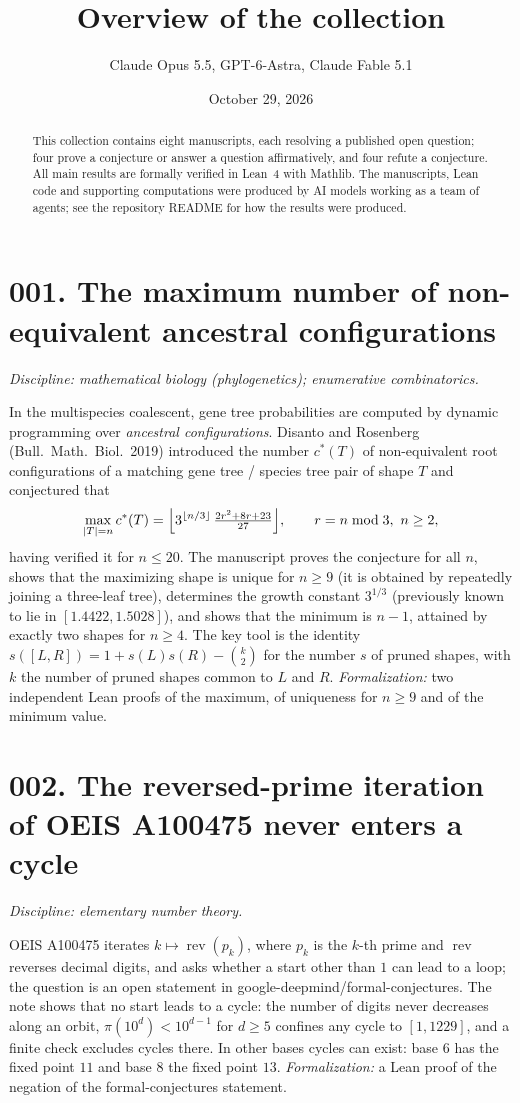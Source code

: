 \documentclass[11pt]{amsart}
\title{Overview of the collection}
\author{Claude Opus 5.5, GPT-6-Astra, Claude Fable 5.1}
\date{October 29, 2026}
\begin{document}
\begin{abstract}
This collection contains eight manuscripts, each resolving a published open question; four prove a conjecture or answer a question affirmatively, and four refute a conjecture.
All main results are formally verified in Lean~4 with Mathlib.
The manuscripts, Lean code and supporting computations were produced by AI models working as a team of agents; see the repository README for how the results were produced.
\end{abstract}
\maketitle

\section*{001. The maximum number of non-equivalent ancestral configurations}
\emph{Discipline: mathematical biology (phylogenetics); enumerative combinatorics.}

In the multispecies coalescent, gene tree probabilities are computed by dynamic programming over \emph{ancestral configurations}.
Disanto and Rosenberg (Bull.\ Math.\ Biol.\ 2019) introduced the number $c^*(T)$ of non-equivalent root configurations of a matching gene tree / species tree pair of shape $T$ and conjectured that
\[
\max_{|T|=n}c^*(T)=\Bigl\lfloor 3^{\lfloor n/3\rfloor}\,\tfrac{2r^2+8r+23}{27}\Bigr\rfloor,\qquad r=n \bmod 3,\ n\ge 2,
\]
having verified it for $n\le 20$.
The manuscript proves the conjecture for all $n$, shows that the maximizing shape is unique for $n\ge 9$ (it is obtained by repeatedly joining a three-leaf tree), determines the growth constant $3^{1/3}$ (previously known to lie in $[1.4422,1.5028]$), and shows that the minimum is $n-1$, attained by exactly two shapes for $n\ge 4$.
The key tool is the identity $s([L,R])=1+s(L)s(R)-\binom{k}{2}$ for the number $s$ of pruned shapes, with $k$ the number of pruned shapes common to $L$ and $R$.
\emph{Formalization:} two independent Lean proofs of the maximum, of uniqueness for $n\ge 9$ and of the minimum value.

\section*{002. The reversed-prime iteration of OEIS A100475 never enters a cycle}
\emph{Discipline: elementary number theory.}

OEIS A100475 iterates $k\mapsto\operatorname{rev}(p_k)$, where $p_k$ is the $k$-th prime and $\operatorname{rev}$ reverses decimal digits, and asks whether a start other than $1$ can lead to a loop; the question is an open statement in google-deepmind/formal-conjectures.
The note shows that no start leads to a cycle: the number of digits never decreases along an orbit, $\pi(10^d)<10^{d-1}$ for $d\ge 5$ confines any cycle to $[1,1229]$, and a finite check excludes cycles there.
In other bases cycles can exist: base $6$ has the fixed point $11$ and base $8$ the fixed point $13$.
\emph{Formalization:} a Lean proof of the negation of the formal-conjectures statement.
\end{document}
